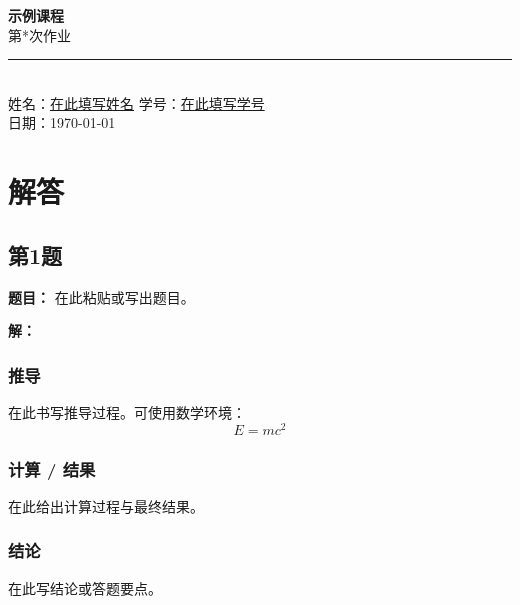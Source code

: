 \documentclass[UTF8]{ctexart}
\newcommand{\course}{示例课程}
\newcommand{\assignment}{第*次作业}
\newcommand{\studentname}{在此填写姓名}
\newcommand{\studentid}{在此填写学号}
\newcommand{\due}{\today}
\begin{document}
\begin{center}
  {\Huge \bfseries \course}\\[1ex]
  {\large \assignment}\\[2ex]
  \rule{0.6\textwidth}{0.6pt}\\[2ex]
  姓名：\underline{\studentname} \quad 学号：\underline{\studentid} \\
  日期：\due
\end{center}

\vspace{1.5em}

\section*{解答}

\subsection*{第1题}
\textbf{题目：} 在此粘贴或写出题目。

\textbf{解：}
\vspace{1em}

\subsubsection*{推导}
在此书写推导过程。可使用数学环境：
\[ E=mc^2 \]

\subsubsection*{计算 / 结果}
在此给出计算过程与最终结果。

\subsubsection*{结论}
在此写结论或答题要点。


\vfill
\end{document}

